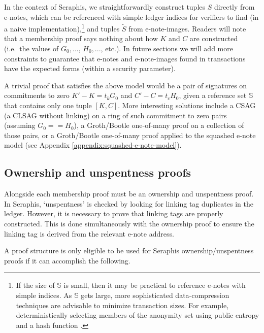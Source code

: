 In the context of Seraphis, we straightforwardly construct tuples $S$ directly from e-notes, which can be referenced with simple ledger indices for verifiers to find (in a naive implementation),\footnote{If the size of $\mathbb{S}$ is small, then it may be practical to reference e-notes with simple indices. As $\mathbb{S}$ gets large, more sophisticated data-compression techniques are advisable to minimize transaction sizes. For example, deterministically selecting members of the anonymity set using public entropy and a hash function \cite{chator-green-how-to-squeeze-crowd}.} and tuples $\tilde{S}$ from e-note-images. Readers will note that a membership proof says nothing about how $K$ and $C$ are constructed (i.e.\ the values of $G_0,...$, $H_0,...$, etc.). In future sections we will add more constraints to guarantee that e-notes and e-note-images found in transactions have the expected forms (within a security parameter).

A trivial proof that satisfies the above model would be a pair of signatures on commitments to zero $K' - K = t_k G_0$ and $C' - C = t_c H_0$, given a reference set $\mathbb{S}$ that contains only one tuple $[K, C]$. More interesting solutions include a CSAG (a CLSAG \cite{clsag-eprint} without linking) on a ring of such commitment to zero pairs (assuming $G_0 == H_0$), a Groth/Bootle one-of-many proof \cite{groth-one-out-of-many, bootle-one-of-many, triptych-preprint, lelantus-spark} on a collection of those pairs, or a Groth/Bootle one-of-many proof applied to the squashed e-note model (see Appendix \ref{appendix:squashed-e-note-model}).


\subsection{Ownership and unspentness proofs}
\label{subsec:seraphis-ownership-unspentness-proofs}

Alongside each membership proof must be an ownership and unspentness proof. In Seraphis, `unspentness' is checked by looking for linking tag duplicates in the ledger. However, it is necessary to prove that linking tags are properly constructed. This is done simultaneously with the ownership proof to ensure the linking tag is derived from the relevant e-note address.

A proof structure is only eligible to be used for Seraphis ownership/unspentness proofs if it can accomplish the following.

